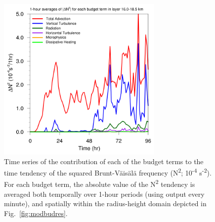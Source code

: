 \documentclass{ametsoc}
\begin{document}
\begin{figure}[ht]
\centerline{\includegraphics[width=19pc]{figures/fig04_AVG_budterms.png}}
\caption{Time series of the contribution of each of the budget terms to the time tendency of the squared Brunt-V{\"a}is{\"a}l{\"a} frequency (N\textsuperscript{2}; 10\textsuperscript{-4} s\textsuperscript{-2}). For each budget term, the absolute value of the N\textsuperscript{2} tendency is averaged both temporally over 1-hour periods (using output every minute), and spatially within the radius-height domain depicted in Fig.~\ref{fig:modbudres}.}
\label{fig:avgbudterms}
\end{figure}
\end{document}
